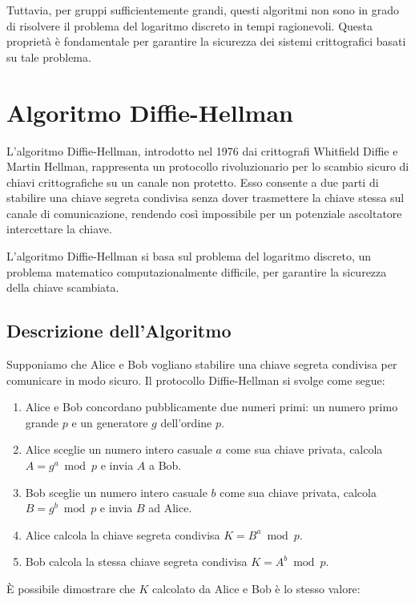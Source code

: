 \documentclass[a4paper,12pt]{report}
\begin{document}
Tuttavia, per gruppi sufficientemente grandi, questi algoritmi non sono in grado di risolvere il problema del logaritmo discreto in tempi ragionevoli. Questa proprietà è fondamentale per garantire la sicurezza dei sistemi crittografici basati su tale problema.
%
%
%
%
%
%
%
%
%
%
%
%
%
%
\chapter{Algoritmo Diffie-Hellman}
L'algoritmo Diffie-Hellman, introdotto nel 1976 dai crittografi Whitfield Diffie e Martin Hellman, rappresenta un protocollo rivoluzionario per lo scambio sicuro di chiavi crittografiche su un canale non protetto. Esso consente a due parti di stabilire una chiave segreta condivisa senza dover trasmettere la chiave stessa sul canale di comunicazione, rendendo così impossibile per un potenziale ascoltatore intercettare la chiave.

L'algoritmo Diffie-Hellman si basa sul problema del logaritmo discreto, un problema matematico computazionalmente difficile, per garantire la sicurezza della chiave scambiata.

\section{Descrizione dell'Algoritmo}

Supponiamo che Alice e Bob vogliano stabilire una chiave segreta condivisa per comunicare in modo sicuro. Il protocollo Diffie-Hellman si svolge come segue:

\begin{enumerate}
    \item Alice e Bob concordano pubblicamente due numeri primi: un numero primo grande $p$ e un generatore $g$ dell'ordine $p$.
    \item Alice sceglie un numero intero casuale $a$ come sua chiave privata, calcola $A = g^a \bmod p$ e invia $A$ a Bob.
    \item Bob sceglie un numero intero casuale $b$ come sua chiave privata, calcola $B = g^b \bmod p$ e invia $B$ ad Alice.
    \item Alice calcola la chiave segreta condivisa $K = B^a \bmod p$.
    \item Bob calcola la stessa chiave segreta condivisa $K = A^b \bmod p$.
\end{enumerate}

È possibile dimostrare che $K$ calcolato da Alice e Bob è lo stesso valore:
\end{document}

